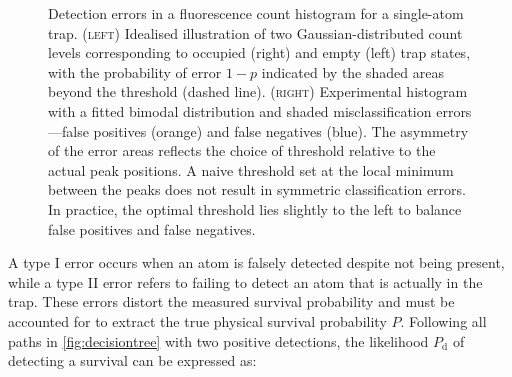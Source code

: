 \documentclass[../Thesis-IJspeert.tex]{subfiles}
\begin{document}
\begin{figure}[t!]
	\caption[Detection errors in a fluorescence count histogram for a single-atom trap]{Detection errors in a fluorescence count histogram for a single-atom trap. \textsc{(left)} Idealised illustration of two Gaussian-distributed count levels corresponding to occupied (right) and empty (left) trap states, with the probability of error $1-p$ indicated by the shaded areas beyond the threshold (dashed line). \textsc{(right)} Experimental histogram with a fitted bimodal distribution and shaded misclassification errors---false positives (orange) and false negatives (blue). The asymmetry of the error areas reflects the choice of threshold relative to the actual peak positions. A naive threshold set at the local minimum between the peaks does not result in symmetric classification errors. In practice, the optimal threshold lies slightly to the left to balance false positives and false negatives.}
	\label{fig:singlethresholdcontrast} 
\end{figure}
A type I error occurs when an atom is falsely detected despite not being present, while a type II error refers to failing to detect an atom that is actually in the trap. These errors distort the measured survival probability and must be accounted for to extract the true physical survival probability $P$. Following all paths in \autoref{fig:decisiontree} with two positive detections, the likelihood $P_\mathrm{d}$ of detecting a survival can be expressed as:
\end{document}
